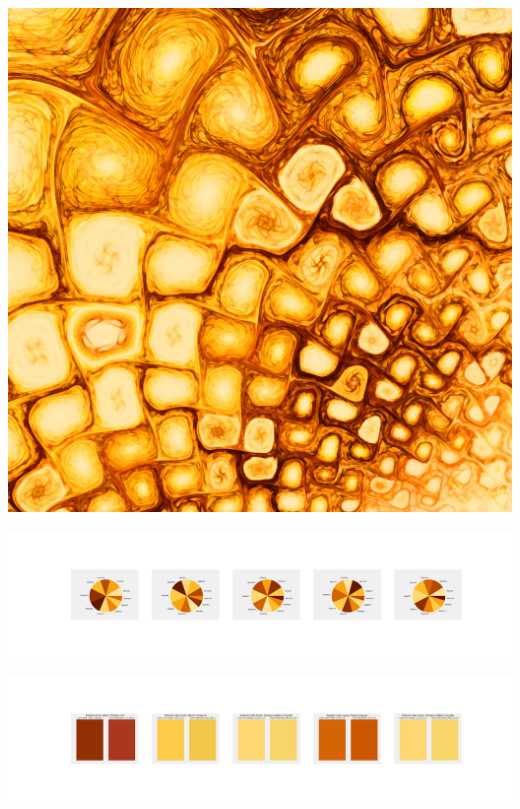 \documentclass[11pt]{article}
\begin{document}
\begin{landscape}
    \begin{center}
    \includegraphics[width=\textwidth]{./nbimg/file (423).jpg}
    \end{center}

    \begin{center}
    \includegraphics[width=250mm]{./nbimg/pie-360.jpg}
    \end{center}

    \begin{center}
    \includegraphics[width=250mm]{./nbimg/peak-360.jpg}
    \end{center}
    


\end{landscape}
\end{document}
